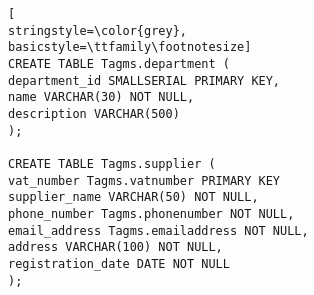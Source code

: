 \begin{lstlisting}[
stringstyle=\color{grey},
basicstyle=\ttfamily\footnotesize]
CREATE TABLE Tagms.department (
department_id SMALLSERIAL PRIMARY KEY,
name VARCHAR(30) NOT NULL,
description VARCHAR(500)
);

CREATE TABLE Tagms.supplier (
vat_number Tagms.vatnumber PRIMARY KEY
supplier_name VARCHAR(50) NOT NULL,
phone_number Tagms.phonenumber NOT NULL,
email_address Tagms.emailaddress NOT NULL,
address VARCHAR(100) NOT NULL,
registration_date DATE NOT NULL
);

\end{lstlisting}